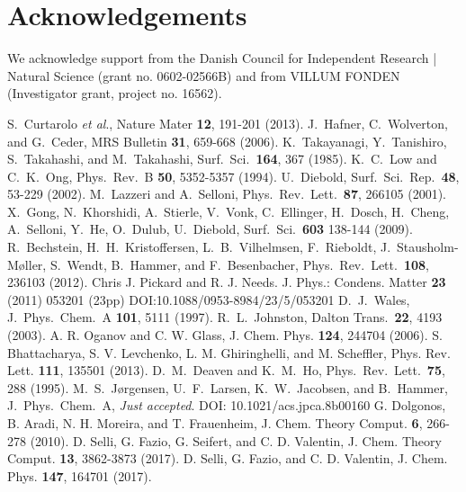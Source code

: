 \documentclass[aip,amsmath,amssymb,reprint]{revtex4-1}
\begin{document}
\section{Acknowledgements}

We acknowledge support from the Danish Council for Independent Research | Natural Science (grant no. 0602-02566B) and from VILLUM FONDEN (Investigator grant, project no. 16562).

\begin{thebibliography}{12}  
 S.\ Curtarolo \textit{et al}., Nature Mater \textbf{12}, 191-201 (2013).
 J.\ Hafner, C.\ Wolverton, and G.\ Ceder, MRS Bulletin \textbf{31}, 659-668 (2006).
K.\ Takayanagi, Y.\ Tanishiro, S.\ Takahashi, and M.\ Takahashi, Surf.\ Sci.\ \textbf{164}, 367 (1985).
K.\ C.\ Low and C.\ K.\ Ong, Phys.\ Rev.\ B \textbf{50}, 5352-5357 (1994).
U.\ Diebold, Surf.\ Sci.\ Rep.\ \textbf{48}, 53-229 (2002).
M.\ Lazzeri and A.\ Selloni, Phys.\ Rev.\ Lett.\ \textbf{87}, 266105 (2001).
X.\ Gong, N.\ Khorshidi, A.\ Stierle, V.\ Vonk, C.\ Ellinger, H.\ Dosch, H.\ Cheng, A.\ Selloni, Y.\ He, O.\ Dulub, U.\ Diebold, Surf.\ Sci.\ \textbf{603} 138-144 (2009).
R.\ Bechstein, H.\ H.\ Kristoffersen, L.\ B.\ Vilhelmsen, F.\ Rieboldt, J.\ Stausholm-M{\o}ller, S.\ Wendt, B.\ Hammer, and F.\ Besenbacher, Phys.\ Rev.\ Lett.\ \textbf{108}, 236103 (2012).
 Chris J. Pickard and R. J. Needs. J. Phys.: Condens. Matter \textbf{23} (2011) 053201 (23pp) DOI:10.1088/0953-8984/23/5/053201
D.\ J.\ Wales, J.\ Phys.\ Chem.\ A \textbf{101}, 5111 (1997).
R.\ L.\ Johnston, Dalton Trans.\ \textbf{22}, 4193 (2003).
A. R. Oganov and C. W. Glass, J. Chem. Phys. \textbf{124}, 244704 (2006).
S. Bhattacharya, S. V. Levchenko, L. M. Ghiringhelli, and M. Scheffler, Phys. Rev. Lett. \textbf{111}, 135501 (2013).
D.\ M.\ Deaven and K.\ M.\ Ho, Phys.\ Rev.\ Lett.\ \textbf{75}, 288 (1995).
M.\ S.\ J{\o}rgensen, U.\ F.\ Larsen, K.\ W.\ Jacobsen, and B.\ Hammer, J.\ Phys.\ Chem.\ A, \textit{Just accepted}. DOI: 10.1021/acs.jpca.8b00160
G. Dolgonos, B. Aradi, N. H. Moreira, and T. Frauenheim, J. Chem. Theory Comput. \textbf{6}, 266-278 (2010).
D. Selli, G. Fazio, G. Seifert, and C. D. Valentin, J. Chem. Theory Comput. \textbf{13}, 3862-3873 (2017).
D. Selli, G. Fazio, and C. D. Valentin, J. Chem. Phys. \textbf{147}, 164701 (2017).

\end{thebibliography}
\end{document}
